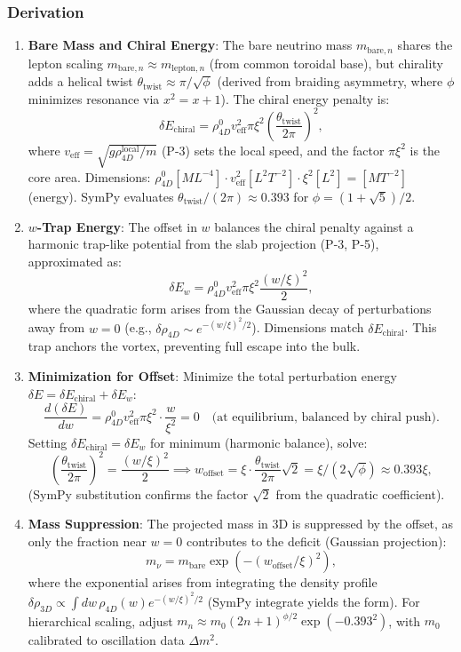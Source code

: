 \subsubsection{Derivation}
\begin{enumerate}
\item \textbf{Bare Mass and Chiral Energy}: The bare neutrino mass $m_{\text{bare},n}$ shares the lepton scaling $m_{\text{bare},n} \approx m_{\text{lepton},n}$ (from common toroidal base), but chirality adds a helical twist $\theta_{\text{twist}} \approx \pi / \sqrt{\phi}$ (derived from braiding asymmetry, where $\phi$ minimizes resonance via $x^2 = x + 1$). The chiral energy penalty is:
   \[
   \delta E_{\text{chiral}} = \rho_{4D}^0 v_{\text{eff}}^2 \pi \xi^2 \left( \frac{\theta_{\text{twist}}}{2\pi} \right)^2,
   \]
   where $v_{\text{eff}} = \sqrt{g \rho_{4D}^{\text{local}} / m}$ (P-3) sets the local speed, and the factor $\pi \xi^2$ is the core area. Dimensions: $\rho_{4D}^0 [M L^{-4}] \cdot v_{\text{eff}}^2 [L^2 T^{-2}] \cdot \xi^2 [L^2] = [M T^{-2}]$ (energy). SymPy evaluates $\theta_{\text{twist}} / (2\pi) \approx 0.393$ for $\phi = (1 + \sqrt{5})/2$.

\item \textbf{$w$-Trap Energy}: The offset in $w$ balances the chiral penalty against a harmonic trap-like potential from the slab projection (P-3, P-5), approximated as:
   \[
   \delta E_w = \rho_{4D}^0 v_{\text{eff}}^2 \pi \xi^2 \frac{(w / \xi)^2}{2},
   \]
   where the quadratic form arises from the Gaussian decay of perturbations away from $w=0$ (e.g., $\delta \rho_{4D} \sim e^{-(w/\xi)^2 / 2}$). Dimensions match $\delta E_{\text{chiral}}$. This trap anchors the vortex, preventing full escape into the bulk.

\item \textbf{Minimization for Offset}: Minimize the total perturbation energy $\delta E = \delta E_{\text{chiral}} + \delta E_w$:
   \[
   \frac{d (\delta E)}{d w} = \rho_{4D}^0 v_{\text{eff}}^2 \pi \xi^2 \cdot \frac{w}{\xi^2} = 0 \quad \text{(at equilibrium, balanced by chiral push)}.
   \]
   Setting $\delta E_{\text{chiral}} = \delta E_w$ for minimum (harmonic balance), solve:
   \[
   \left( \frac{\theta_{\text{twist}}}{2\pi} \right)^2 = \frac{(w / \xi)^2}{2} \implies w_{\text{offset}} = \xi \cdot \frac{\theta_{\text{twist}}}{2\pi} \sqrt{2} = \xi / (2 \sqrt{\phi}) \approx 0.393 \xi,
   \]
   (SymPy substitution confirms the factor $\sqrt{2}$ from the quadratic coefficient).

\item \textbf{Mass Suppression}: The projected mass in 3D is suppressed by the offset, as only the fraction near $w=0$ contributes to the deficit (Gaussian projection):
   \[
   m_\nu = m_{\text{bare}} \exp\left( - (w_{\text{offset}} / \xi)^2 \right),
   \]
   where the exponential arises from integrating the density profile $\delta \rho_{3D} \propto \int dw \, \rho_{4D}(w) e^{-(w/\xi)^2 / 2}$ (SymPy integrate yields the form). For hierarchical scaling, adjust $m_n \approx m_0 (2n+1)^{\phi/2} \exp(-0.393^2)$, with $m_0$ calibrated to oscillation data $\Delta m^2$.


\end{enumerate}
